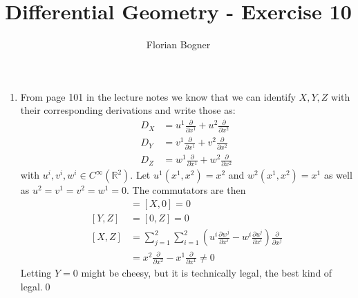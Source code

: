 \documentclass[a4paper,11pt,notitlepage,fullpage]{article}
\begin{document}
\author{Florian Bogner}
\title{Differential Geometry - Exercise 10}
\maketitle


\begin{enumerate}
\item From page 101 in the lecture notes we know that we can identify $X, Y, Z$ with their corresponding derivations and write those as:
\begin{align*}
D_X &= u^1 \frac{\partial}{\partial x^1} + u^2 \frac{\partial}{\partial x^2} \\
D_Y &= v^1 \frac{\partial}{\partial x^1} + v^2 \frac{\partial}{\partial x^2} \\
D_Z &= w^1 \frac{\partial}{\partial x^1} + w^2 \frac{\partial}{\partial x^2}
\end{align*}
with $u^i, v^i, w^i \in C^\infty(\mathbb R^2)$. Let $u^1(x^1, x^2) = x^2$ and $w^2(x^1,x^2) = x^1$ as well as $u^2 = v^1 = v^2 = w^1 = 0$.
The commutators are then
\begin{align*}
[X, Y] &= [X, 0] = 0 \\
[Y, Z] &= [0, Z] = 0 \\
[X, Z] &= \sum_{j=1}^2 \sum_{i=1}^2 \left(u^i \frac{\partial w^j}{\partial x^i} - w^i \frac{\partial u^j}{\partial x^i}\right) \frac{\partial}{\partial x^j} \\
&= x^2 \frac{\partial}{\partial x^2} - x^1 \frac{\partial}{\partial x^1} \neq 0
\end{align*}
Letting $Y = 0$ might be cheesy, but it is technically legal, the best kind of legal.\qed


\end{enumerate}
\end{document}

